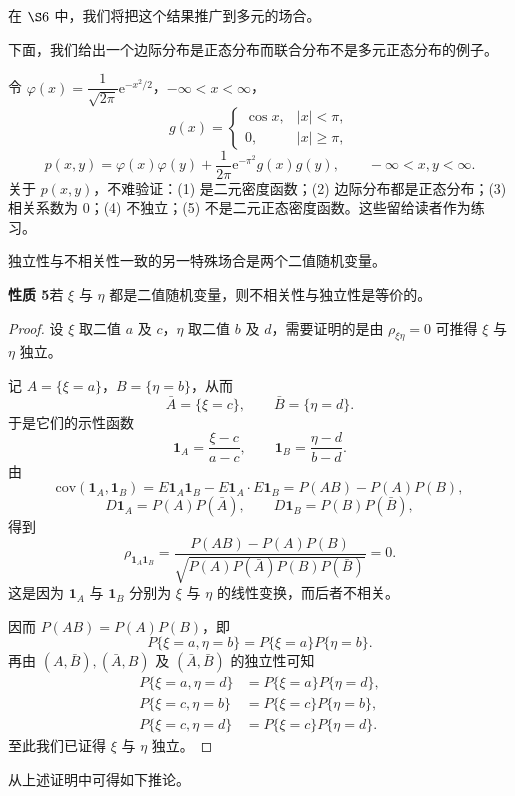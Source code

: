\documentclass[../../main.tex]{subfiles}
\begin{document}
在 $\S 6$ 中，我们将把这个结果推广到多元的场合。

下面，我们给出一个边际分布是正态分布而联合分布不是多元正态分布的例子。

\begin{example}[边际正态而联合非正态]\label{example:ch04-边际正态非联合}
令 $\varphi(x)=\dfrac{1}{\sqrt{2\pi}}\mathrm{e}^{-x^2/2}$，$-\infty<x<\infty$，
\[
g(x)=\begin{cases}
\cos x,&|x|<\pi,\\
0,&|x|\geqslant\pi,
\end{cases}
\]
\[
p(x,y)=\varphi(x)\varphi(y)+\frac{1}{2\pi}\mathrm{e}^{-\pi^2}g(x)g(y),\qquad -\infty<x,y<\infty.
\]
关于 $p(x,y)$，不难验证：(1) 是二元密度函数；(2) 边际分布都是正态分布；(3) 相关系数为 $0$；(4) 不独立；(5) 不是二元正态密度函数。这些留给读者作为练习。
\end{example}

独立性与不相关性一致的另一特殊场合是两个二值随机变量。

\noindent\textbf{性质 5}\quad 若 $\xi$ 与 $\eta$ 都是二值随机变量，则不相关性与独立性是等价的。

\begin{proof}
设 $\xi$ 取二值 $a$ 及 $c$，$\eta$ 取二值 $b$ 及 $d$，需要证明的是由 $\rho_{\xi\eta}=0$ 可推得 $\xi$ 与 $\eta$ 独立。

记 $A=\{\xi=a\}$，$B=\{\eta=b\}$，从而
\[
\bar{A}=\{\xi=c\},\qquad\bar{B}=\{\eta=d\}.
\]
于是它们的示性函数
\[
\mathbf{1}_A=\frac{\xi-c}{a-c},\qquad \mathbf{1}_B=\frac{\eta-d}{b-d}.
\]
由
\[
\mathrm{cov}(\mathbf{1}_A,\mathbf{1}_B)=E\mathbf{1}_A\mathbf{1}_B-E\mathbf{1}_A\cdot E\mathbf{1}_B=P(AB)-P(A)P(B),
\]
\[
D\mathbf{1}_A=P(A)P(\bar{A}),\qquad D\mathbf{1}_B=P(B)P(\bar{B}),
\]
得到
\[
\rho_{\mathbf{1}_A\mathbf{1}_B}=\frac{P(AB)-P(A)P(B)}{\sqrt{P(A)P(\bar{A})P(B)P(\bar{B})}}=0.
\]
这是因为 $\mathbf{1}_A$ 与 $\mathbf{1}_B$ 分别为 $\xi$ 与 $\eta$ 的线性变换，而后者不相关。

因而 $P(AB)=P(A)P(B)$，即
\[
P\{\xi=a,\eta=b\}=P\{\xi=a\}P\{\eta=b\}.
\]
再由 $(A,\bar{B}),(\bar{A},B)$ 及 $(\bar{A},\bar{B})$ 的独立性可知
\begin{align*}
P\{\xi=a,\eta=d\}&=P\{\xi=a\}P\{\eta=d\},\\
P\{\xi=c,\eta=b\}&=P\{\xi=c\}P\{\eta=b\},\\
P\{\xi=c,\eta=d\}&=P\{\xi=c\}P\{\eta=d\}.
\end{align*}
至此我们已证得 $\xi$ 与 $\eta$ 独立。
\end{proof}

从上述证明中可得如下推论。
\end{document}
